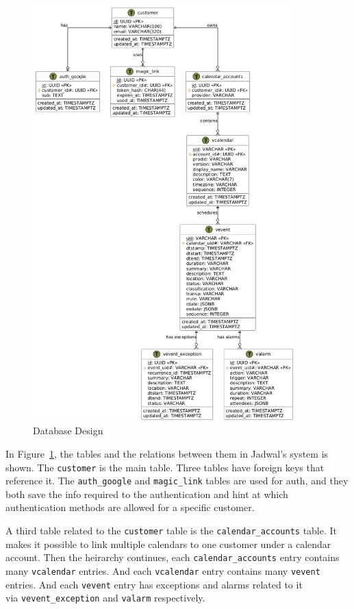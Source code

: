 \documentclass[12pt,a4paper]{report}
\begin{document}
\begin{figure}[!h]
    \centering
    \includegraphics[width=0.9\textwidth]{images/docs/diagrams/er/database/Database Design.png}
    \caption{Database Design}
    \label{fig:database-design}
\end{figure}

\newpage

In Figure~\ref{fig:database-design}, the tables and the relations between them in Jadwal's system is shown. The \texttt{customer} is the main table. Three tables have foreign keys that reference it. The \texttt{auth\_google} and \texttt{magic\_link} tables are used for auth, and they both save the info required to the authentication and hint at which authentication methods are allowed for a specific customer.

A third table related to the \texttt{customer} table is the \texttt{calendar\_accounts} table. It makes it possible to link multiple calendars to one customer under a calendar account. Then the heirarchy continues, each \texttt{calendar\_accounts} entry contains many \texttt{vcalendar} entries. And each \texttt{vcalendar} entry contains many \texttt{vevent} entries. And each \texttt{vevent} entry has exceptions and alarms related to it\\via \texttt{vevent\_exception} and \texttt{valarm} respectively.
\end{document}

